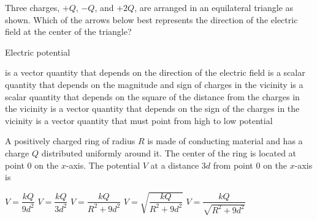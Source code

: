 \documentclass{../../oss-classkick-exam}
\begin{document}
\begin{questions}
  \question Three charges, $+Q$, $-Q$, and $+2Q$, are arranged in an
  equilateral triangle as shown. Which of the arrows below best represents the
  direction of the electric field at the center of the triangle?
  \begin{center}
    \vspace{-.1in}
  \end{center}
  \begin{oneparchoices}
    \choice {\Huge$\downarrow$}
    \choice {\Huge$\uparrow$}
    \choice {\Huge$\searrow$}
    \choice {\Huge$\swarrow$}
    \choice {\Huge$\nearrow$}
  \end{oneparchoices}
 
  \question Electric potential
  \begin{choices}
    \choice is a vector quantity that depends on the direction of the electric
    field
    \choice is a scalar quantity that depends on the magnitude and sign of
    charges in the vicinity
    \choice is a scalar quantity that depends on the square of the distance
    from the charges in the vicinity
    \choice is a vector quantity that depends on the sign of the charges in the
    vicinity
    \choice is a vector quantity that must point from high to low potential
  \end{choices}
  \newpage
   
  \question A positively charged ring of radius $R$ is made of conducting
  material and has a charge $Q$ distributed uniformly around it. The center of
  the ring is located at point $0$ on the $x$-axis. The potential $V$ at a
  distance $3d$ from point $0$ on the $x$-axis is
  \begin{center}
  \end{center}
  \begin{choices}
    \choice $V=\dfrac{kQ}{9d^2}$
    \choice $V=\dfrac{kQ}{3d^2}$
    \choice $V=\dfrac{kQ}{R^2+9d^2}$
    \choice $V=\sqrt{\dfrac{kQ}{R^2+9d^2}}$
    \choice $V=\dfrac{kQ}{\sqrt{R^2+9d^2}}$
  \end{choices}
   

\end{questions}
\end{document}
